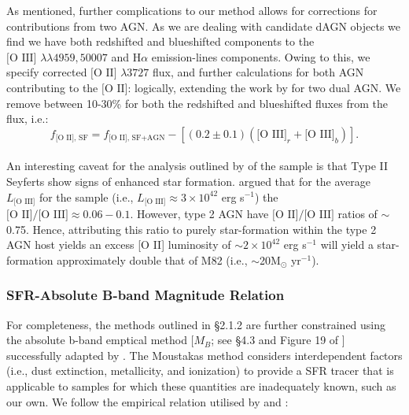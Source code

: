 As mentioned, further complications to our method allows for corrections for contributions from two AGN. As we are dealing with candidate dAGN objects we find we have both redshifted and blueshifted components to the $\text{[O III] }\lambda\lambda4959,50007$ and $\text{H}\alpha$ emission-lines components. Owing to this, we specify corrected $\text{[O II] }\lambda3727$ flux, and further calculations for both AGN contributing to the $\text{[O II]}$: logically, extending the work by \cite{2006ApJ...642..702K} for two dual AGN. We remove between 10-30\% for both the redshifted and blueshifted \text{[O III]} fluxes from the \text{[O II]} flux, i.e.:
\\
\begin{equation}
\label{eq:KimCorrection}
f_{\text{[O II], SF}}=f_{\text{[O II], SF+AGN}}-\left[(0.2\pm{0.1})(\text{[O III]}_r+\text{[O III]}_b)\right].
\end{equation}
\\
An interesting caveat for the analysis outlined by \cite{2006ApJ...642..702K} of the \cite{Zakamska2003} sample is that Type II Seyferts show signs of enhanced star formation. \cite{2006ApJ...642..702K} argued that for the average $L_{\text{[O III]}}$ for the \cite{Zakamska2003} sample (i.e., $L_{\text{[O III]}}\approx{3\times{10^{42}}}$ erg s$^{-1}$) the $\text{[O II]/[O III]}\approx{0.06-0.1}$. However, type 2 AGN have $\text{[O II]/[O III]}$ ratios of $\sim$0.75. Hence, attributing this ratio to purely star-formation within the type 2 AGN host yields an excess [O II] luminosity of $\sim{2\times{10^{42}}}$ erg s$^{-1}$ will yield a star-formation approximately double that of M82 (i.e., $\sim$20M$_{\odot}$ yr$^{-1}$).

\subsubsection{SFR-Absolute B-band Magnitude Relation}

For completeness, the methods outlined in §2.1.2 are further constrained using the absolute b-band emptical method [$M_{B}$; see §4.3 and Figure 19 of \cite{Moustakas_2006}] successfully adapted by \cite{2009ApJ...696..396S}. The Moustakas method considers interdependent factors (i.e., dust extinction, metallicity, and ionization) to provide a SFR tracer that is applicable to samples for which these quantities are inadequately known, such as our own. We follow the empirical relation utilised by \cite{Maier_2009} and \cite{2009ApJ...696..396S}:
